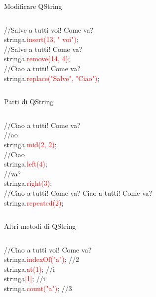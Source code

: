 \documentclass{beamer}
\begin{document}
\begin{frame}{Modificare QString}
	\begin{columns}
		\begin{block}{}
			{\ttfamily //Salve a tutti voi! Come va?\\
				stringa.\textcolor{red}{insert(13, " voi")};\\
				\bigskip
				//Salve a tutti! Come va?\\
				stringa.\textcolor{red}{remove(14, 4)};\\
				\bigskip
				//Ciao a tutti! Come va?\\
				stringa.\textcolor{red}{replace("Salve", "Ciao")};}
		\end{block}
	\end{columns}
\end{frame}

\begin{frame}{Parti di QString}
	\begin{columns}
		\column{0.9\textwidth}
		\begin{block}{}
			{\ttfamily //Ciao a tutti! Come va?\\
				\bigskip
				//ao\\
				stringa.\textcolor{red}{mid(2, 2)};\\
				\bigskip
				//Ciao\\
				stringa.\textcolor{red}{left(4)};\\
				\bigskip
				//va?\\
				stringa.\textcolor{red}{right(3)};\\
				\bigskip
				//Ciao a tutti! Come va? Ciao a tutti! Come va?\\
				stringa.\textcolor{red}{repeated(2)};}
		\end{block}
	\end{columns}
\end{frame}

\begin{frame}{Altri metodi di QString}
	\begin{columns}
		\column{0.7\textwidth}
		\begin{block}{}
			{\ttfamily //Ciao a tutti voi! Come va?\\
				\bigskip
				stringa.\textcolor{red}{indexOf("a")}; //2\\
				\bigskip
				stringa.\textcolor{red}{at(1)}; //i\\
				\bigskip
				stringa\textcolor{red}{[1]}; //i\\
				\bigskip
				stringa.\textcolor{red}{count("a")}; //3}
		\end{block}
	\end{columns}
\end{frame}
\end{document}
